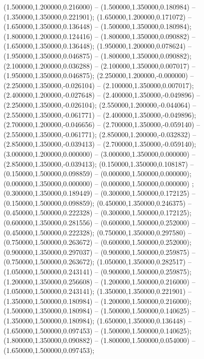  (1.500000,1.200000,0.216000) -- (1.500000,1.350000,0.180984) -- (1.350000,1.350000,0.221901);
 (1.650000,1.200000,0.171072) -- (1.650000,1.350000,0.136448) -- (1.500000,1.350000,0.180984);
 (1.800000,1.200000,0.124416) -- (1.800000,1.350000,0.090882) -- (1.650000,1.350000,0.136448);
 (1.950000,1.200000,0.078624) -- (1.950000,1.350000,0.046875) -- (1.800000,1.350000,0.090882);
 (2.100000,1.200000,0.036288) -- (2.100000,1.350000,0.007017) -- (1.950000,1.350000,0.046875);
 (2.250000,1.200000,-0.000000) -- (2.250000,1.350000,-0.026104) -- (2.100000,1.350000,0.007017);
 (2.400000,1.200000,-0.027648) -- (2.400000,1.350000,-0.049896) -- (2.250000,1.350000,-0.026104);
 (2.550000,1.200000,-0.044064) -- (2.550000,1.350000,-0.061771) -- (2.400000,1.350000,-0.049896);
 (2.700000,1.200000,-0.046656) -- (2.700000,1.350000,-0.059140) -- (2.550000,1.350000,-0.061771);
 (2.850000,1.200000,-0.032832) -- (2.850000,1.350000,-0.039413) -- (2.700000,1.350000,-0.059140);
 (3.000000,1.200000,0.000000) -- (3.000000,1.350000,0.000000) -- (2.850000,1.350000,-0.039413);
 (0.150000,1.350000,0.108187) -- (0.150000,1.500000,0.098859) -- (0.000000,1.500000,0.000000);
 (0.000000,1.350000,0.000000) -- (0.000000,1.500000,0.000000) ;
 (0.300000,1.350000,0.189449) -- (0.300000,1.500000,0.172125) -- (0.150000,1.500000,0.098859);
 (0.450000,1.350000,0.246375) -- (0.450000,1.500000,0.222328) -- (0.300000,1.500000,0.172125);
 (0.600000,1.350000,0.281556) -- (0.600000,1.500000,0.252000) -- (0.450000,1.500000,0.222328);
 (0.750000,1.350000,0.297580) -- (0.750000,1.500000,0.263672) -- (0.600000,1.500000,0.252000);
 (0.900000,1.350000,0.297037) -- (0.900000,1.500000,0.259875) -- (0.750000,1.500000,0.263672);
 (1.050000,1.350000,0.282517) -- (1.050000,1.500000,0.243141) -- (0.900000,1.500000,0.259875);
 (1.200000,1.350000,0.256608) -- (1.200000,1.500000,0.216000) -- (1.050000,1.500000,0.243141);
 (1.350000,1.350000,0.221901) -- (1.350000,1.500000,0.180984) -- (1.200000,1.500000,0.216000);
 (1.500000,1.350000,0.180984) -- (1.500000,1.500000,0.140625) -- (1.350000,1.500000,0.180984);
 (1.650000,1.350000,0.136448) -- (1.650000,1.500000,0.097453) -- (1.500000,1.500000,0.140625);
 (1.800000,1.350000,0.090882) -- (1.800000,1.500000,0.054000) -- (1.650000,1.500000,0.097453);
